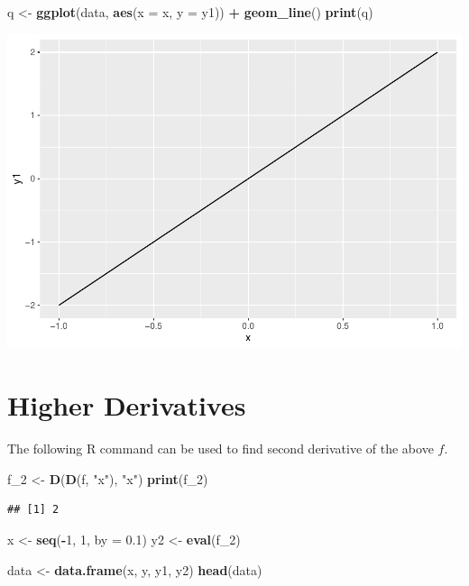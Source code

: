 \documentclass[]{book}
\newenvironment{Shaded}{\begin{snugshade}}{\end{snugshade}}
\newcommand{\DataTypeTok}[1]{\textcolor[rgb]{0.13,0.29,0.53}{#1}}
\newcommand{\DecValTok}[1]{\textcolor[rgb]{0.00,0.00,0.81}{#1}}
\newcommand{\FloatTok}[1]{\textcolor[rgb]{0.00,0.00,0.81}{#1}}
\newcommand{\KeywordTok}[1]{\textcolor[rgb]{0.13,0.29,0.53}{\textbf{#1}}}
\newcommand{\NormalTok}[1]{#1}
\newcommand{\OperatorTok}[1]{\textcolor[rgb]{0.81,0.36,0.00}{\textbf{#1}}}
\newcommand{\StringTok}[1]{\textcolor[rgb]{0.31,0.60,0.02}{#1}}
\begin{document}
\begin{Shaded}
\begin{Highlighting}[]
\NormalTok{q <-}\StringTok{ }\KeywordTok{ggplot}\NormalTok{(data, }\KeywordTok{aes}\NormalTok{(}\DataTypeTok{x =}\NormalTok{ x, }\DataTypeTok{y =}\NormalTok{ y1)) }\OperatorTok{+}
\StringTok{  }\KeywordTok{geom_line}\NormalTok{()}
\KeywordTok{print}\NormalTok{(q)}
\end{Highlighting}
\end{Shaded}

\includegraphics{bookdown-demo_files/figure-latex/unnamed-chunk-8-1.pdf}

\hypertarget{higher-derivatives}{%
\section{Higher Derivatives}\label{higher-derivatives}}

The following R command can be used to find second derivative of the above \(f\).

\begin{Shaded}
\begin{Highlighting}[]
\NormalTok{f_}\DecValTok{2}\NormalTok{ <-}\StringTok{ }\KeywordTok{D}\NormalTok{(}\KeywordTok{D}\NormalTok{(f, }\StringTok{"x"}\NormalTok{), }\StringTok{"x"}\NormalTok{)}
\KeywordTok{print}\NormalTok{(f_}\DecValTok{2}\NormalTok{)}
\end{Highlighting}
\end{Shaded}

\begin{verbatim}
## [1] 2
\end{verbatim}

\begin{Shaded}
\begin{Highlighting}[]
\NormalTok{x <-}\StringTok{ }\KeywordTok{seq}\NormalTok{(}\OperatorTok{-}\DecValTok{1}\NormalTok{, }\DecValTok{1}\NormalTok{, }\DataTypeTok{by =} \FloatTok{0.1}\NormalTok{)}
\NormalTok{y2 <-}\StringTok{ }\KeywordTok{eval}\NormalTok{(f_}\DecValTok{2}\NormalTok{)}

\NormalTok{data <-}\StringTok{ }\KeywordTok{data.frame}\NormalTok{(x, y, y1, y2)}
\KeywordTok{head}\NormalTok{(data)}
\end{Highlighting}
\end{Shaded}
\end{document}
